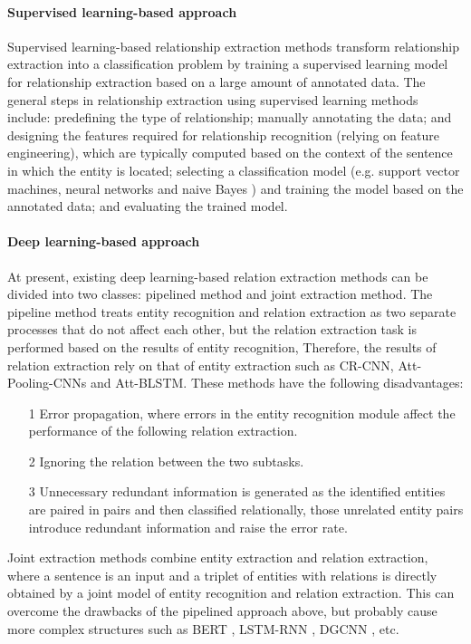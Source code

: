 \documentclass[%
 aip,
 jmp,%
 amsmath,amssymb,
 reprint,%
]{revtex4-2}
\begin{document}
\paragraph{Supervised learning-based approach}
Supervised learning-based relationship extraction methods transform relationship extraction into a classification problem by training a supervised learning model for relationship extraction based on a large amount of annotated data\cite{onishi2018relation, timoshenko2017supervised, ciaburro2021machine}. The general steps in relationship extraction using supervised learning methods include: predefining the type of relationship; manually annotating the data; and designing the features required for relationship recognition (relying on feature engineering\cite{turner1999conceptual}), which are typically computed based on the context of the sentence in which the entity is located; selecting a classification model (e.g. support vector machines\cite{huang2018applications}, neural networks and naive Bayes \cite{frasconi2001text}) and training the model based on the annotated data; and evaluating the trained model.

\paragraph{Deep learning-based approach}
At present, existing deep learning-based relation extraction methods can be divided into two classes: pipelined method and joint extraction method\cite{zheng2017joint}.
The pipeline method treats entity recognition and relation extraction as two separate processes that 
do not affect each other, but the relation extraction task is performed based on the results of entity recognition,
Therefore, the results of relation extraction rely on that of entity extraction such as CR-CNN\cite{nogueira2015classifying},
Att-Pooling-CNNs\cite{li2018attention} and Att-BLSTM\cite{chen2018wifi}. These methods have the following disadvantages:
\begin{itemize}
    \item[1] Error propagation, where errors in the entity recognition module affect the performance of the following relation extraction.
    \item[2] Ignoring the relation between the two subtasks.
    \item[3] Unnecessary redundant information is generated as the identified entities are paired in pairs and then classified relationally, those unrelated entity pairs introduce redundant information and raise the error rate.
\end{itemize}
Joint extraction methods combine entity extraction and relation extraction, where a sentence is an input and a triplet of entities with relations is directly obtained by a joint model of entity recognition and relation extraction. This can overcome the drawbacks of the pipelined approach above, but probably cause more 
complex structures such as BERT \cite{tenney2019bert}, LSTM-RNN \cite{selvin2017stock}, DGCNN \cite{phan2018dgcnn}, etc.
\end{document}
